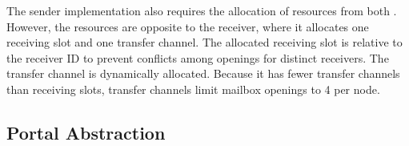 
				The sender implementation also requires the allocation of resources
				from both \nocs. However, the resources are opposite to the receiver,
				where it allocates one \cnoc receiving slot and one \dnoc transfer channel.
				The allocated \cnoc receiving slot is relative to the receiver ID to
				prevent conflicts among openings for distinct receivers. The transfer
				channel is dynamically allocated. Because it has fewer transfer channels
				than receiving slots, transfer channels limit mailbox openings to 4 per node.

		\subsection{Portal Abstraction}
		\label{sec.portal-abs}





